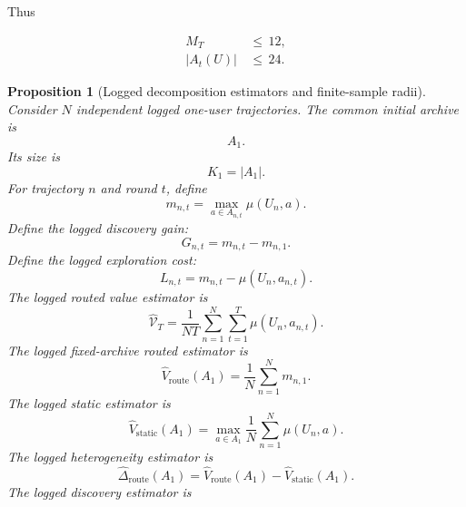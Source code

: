 \documentclass{article} %
\newtheorem{proposition}[theorem]{Proposition}
\begin{document}
Thus

\begin{align}
\label{eq:app-six-cooldown-example-final}
M_T
&\,\le\,
12,
\\
|A_t(U)|
&\,\le\,
24.
\end{align}

\begin{proposition}[Logged decomposition estimators and finite-sample radii]
\label{prop:16}
Consider \(N\) independent logged one-user trajectories.  The common initial archive is
\begin{equation}
\label{eq:app-six-logged-A1}
A_1.
\end{equation}
Its size is
\begin{equation}
\label{eq:app-six-logged-K1}
K_1=|A_1|.
\end{equation}
For trajectory \(n\) and round \(t\), define
\begin{equation}
\label{eq:app-six-logged-m}
m_{n,t}
=
\max_{a\in A_{n,t}}\mu(U_n,a).
\end{equation}
Define the logged discovery gain:
\begin{equation}
\label{eq:app-six-logged-G}
G_{n,t}
=
m_{n,t}-m_{n,1}.
\end{equation}
Define the logged exploration cost:
\begin{equation}
\label{eq:app-six-logged-L}
L_{n,t}
=
m_{n,t}-\mu(U_n,a_{n,t}).
\end{equation}
The logged routed value estimator is
\begin{equation}
\label{eq:app-six-hat-value}
\widehat{\mathcal{V}}_T
=
\frac{1}{NT}\sum_{n=1}^{N}\sum_{t=1}^{T}
\mu(U_n,a_{n,t}).
\end{equation}
The logged fixed-archive routed estimator is
\begin{equation}
\label{eq:app-six-hat-route}
\widehat V_{\mathrm{route}}(A_1)
=
\frac{1}{N}\sum_{n=1}^{N}m_{n,1}.
\end{equation}
The logged static estimator is
\begin{equation}
\label{eq:app-six-hat-static}
\widehat V_{\mathrm{static}}(A_1)
=
\max_{a\in A_1}
\frac{1}{N}\sum_{n=1}^{N}\mu(U_n,a).
\end{equation}
The logged heterogeneity estimator is
\begin{equation}
\label{eq:app-six-hat-het}
\widehat\Delta_{\mathrm{route}}(A_1)
=
\widehat V_{\mathrm{route}}(A_1)
-
\widehat V_{\mathrm{static}}(A_1).
\end{equation}
The logged discovery estimator is
\begin{equation}

\end{equation}
\end{proposition}
\end{document}
